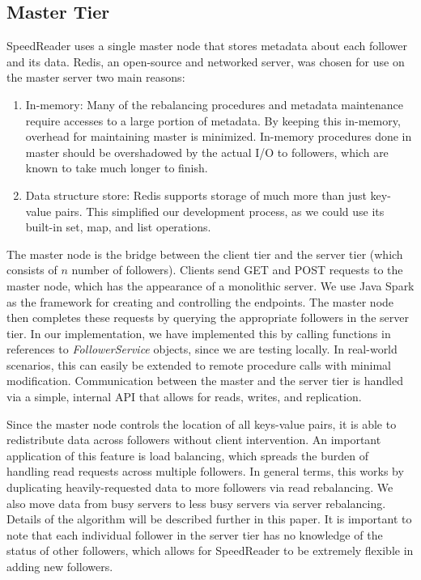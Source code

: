 \documentclass[twoside]{article}
\begin{document}
\begin{multicols}{2}
\subsection*{Master Tier}
SpeedReader uses a single master node that stores metadata about each follower and its data. Redis, an open-source and networked server, was chosen for use on the master server two main reasons:
\begin{enumerate}
	\item In-memory: Many of the rebalancing procedures and metadata maintenance require accesses to a large portion of metadata. By keeping this in-memory, overhead for maintaining master is minimized. In-memory procedures done in master should be overshadowed by the actual I/O to followers, which are known to take much longer to finish.
	\item Data structure store: Redis supports storage of much more than just key-value pairs. This simplified our development process, as we could use its built-in set, map, and list operations.
\end{enumerate}

The master node is the bridge between the client tier and the server tier (which consists of $n$ number of followers). Clients send GET and POST requests to the master node, which has the appearance of a monolithic server. We use Java Spark as the framework for creating and controlling the endpoints. The master node then completes these requests by querying the appropriate followers in the server tier. In our implementation, we have implemented this by calling functions in references to \emph{FollowerService} objects, since we are testing locally. In real-world scenarios, this can easily be extended to remote procedure calls with minimal modification. Communication between the master and the server tier is handled via a simple, internal API that allows for reads, writes, and replication. 

Since the master node controls the location of all keys-value pairs, it is able to redistribute data across followers without client intervention. An important application of this feature is load balancing, which spreads the burden of handling read requests across multiple followers. In general terms, this works by duplicating heavily-requested data to more followers via read rebalancing. We also move data from busy servers to less busy servers via server rebalancing. Details of the algorithm will be described further in this paper. It is important to note that each individual follower in the server tier has no knowledge of the status of other followers, which allows for SpeedReader to be extremely flexible in adding new followers. 

\end{multicols}
\end{document}
